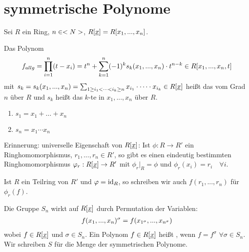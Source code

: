 \section{symmetrische Polynome}

Sei $R$ ein Ring, $n\in<N>$, $R[\uline{x}]=R[x_1,...,x_n]$.

\begin{definition}
	Das Polynom
	\begin{align}
		f_{allg} = \prod_{i=1}^{n} (t-x_i) = t^n + \sum_{k=1}^{n} (-1)^k s_k(x_1,...,x_n)\cdot t^{n-k}\in R[x_1,...,x_n,t] \notag
	\end{align}
	mit $s_k = s_k(x_1,...,x_n) = \sum_{1\ge i_1<\dots< i_k\ge n} x_{i_1}\cdot \dots\cdot x_{i_k}\in R[\uline{x}]$ heißt das  vom Grad $n$ über $R$ und $s_k$ heißt das $k$-te  in $x_1,...,x_n$ über $R$.
\end{definition}

\begin{example}
	\begin{enumerate}[label=(\alph*)]
		\item $s_1 = x_1+\dots +x_n$
		\item $s_n = x_1\cdots x_n$
	\end{enumerate}
\end{example}

\begin{remark}
	Erinnerung: universelle Eigenschaft von $R[\uline{x}]$: Ist $\phi: R\to R'$ ein Ringhomomorphismus, $r_1,...,r_n\in R'$, so gibt es einen eindeutig bestimmten Ringhomomorphismus $\phi_r:R[\uline{x}]\to R'$ mit $\phi_r\vert_R=\phi$ und $\phi_r(x_i)=r_i\quad\forall i$.
	
	Ist $R$ ein Teilring von $R'$ und $\varphi=\operatorname{id}_R$, so schreiben wir auch $f(r_1,...,r_n)$ für $\phi_r(f)$.
\end{remark}

\begin{definition}
	Die Gruppe $S_n$ wirkt auf $R[\uline{x}]$ durch Permutation der Variablen:
	\begin{align}
		f(x_1,...,x_n)^\sigma = f(x_{1^\sigma},...,x_{n^\sigma})\notag
	\end{align}
	wobei $f\in R[\uline{x}]$ und $\sigma\in S_n$. Ein Polynom $f\in R[\uline{x}]$ heißt , wenn $f=f^\sigma$ $\forall\sigma\in S_n$. Wir schreiben $S$ für die Menge der symmetrischen Polynome.
\end{definition}

